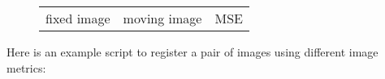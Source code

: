 \begin{figure}
    \label{fig:metric_example}
    \centering
    \begin{tabular}[h]{c|c|c}
        fixed image &
        moving image & 
        MSE  \\
    \end{tabular} 
\end{figure}
Here is an example script to register a pair of images using different image metrics:
